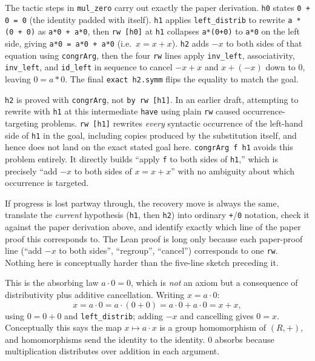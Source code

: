 The tactic steps in \texttt{mul\_\allowbreak{}zero} carry out exactly the paper derivation. \texttt{h0} states \texttt{0 + 0 = 0} (the identity padded with itself). \texttt{h1} applies \texttt{left\_\allowbreak{}distrib} to rewrite \texttt{a * (0 + 0)} as \texttt{a*0 + a*0}, then \texttt{rw [h0]} at \texttt{h1} collapses \texttt{a*(0+0)} to \texttt{a*0} on the left side, giving \texttt{a*0 = a*0 + a*0} (i.e.~\(x = x + x\)). \texttt{h2} adds \(-x\) to both sides of that equation using \texttt{congrArg}, then the four \texttt{rw} lines apply \texttt{inv\_\allowbreak{}left}, associativity, \texttt{inv\_\allowbreak{}left}, and \texttt{id\_\allowbreak{}left} in sequence to cancel \(-x + x\) and \(x + (-x)\) down to \(0\), leaving \(0 = a*0\). The final \texttt{exact h2.symm} flips the equality to match the goal.

\texttt{h2} is proved with \texttt{congrArg}, not \texttt{by rw [h1]}. In an earlier draft, attempting to rewrite with \texttt{h1} at this intermediate \texttt{have} using plain \texttt{rw} caused occurrence-targeting problems. \texttt{rw [h1]} rewrites \emph{every} syntactic occurrence of the left-hand side of \texttt{h1} in the goal, including copies produced by the substitution itself, and hence does not land on the exact stated goal here. \texttt{congrArg f h1} avoids this problem entirely. It directly builds ``apply \texttt{f} to both sides of \texttt{h1},'' which is precisely ``add \(-x\) to both sides of \(x = x+x\)'' with no ambiguity about which occurrence is targeted.

If progress is lost partway through, the recovery move is always the same, translate the \emph{current} hypothesis (\texttt{h1}, then \texttt{h2}) into ordinary \texttt{+}/\texttt{0} notation, check it against the paper derivation above, and identify exactly which line of the paper proof this corresponds to. The Lean proof is long only because each paper-proof line (``add \(-x\) to both sides'', ``regroup'', ``cancel'') corresponds to one \texttt{rw}. Nothing here is conceptually harder than the five-line sketch preceding it.

\begin{mathreading}

This is the absorbing law \(a\cdot 0 = 0\), which is \emph{not} an axiom but a consequence of distributivity plus additive cancellation. Writing \(x = a\cdot 0\): \[
x = a\cdot 0 = a\cdot(0+0) = a\cdot 0 + a\cdot 0 = x + x,
\] using \(0 = 0+0\) and \texttt{left\_\allowbreak{}distrib}; adding \(-x\) and cancelling gives \(0 = x\). Conceptually this says the map \(x \mapsto a\cdot x\) is a group homomorphism of \((R,+)\), and homomorphisms send the identity to the identity. \(0\) absorbs because multiplication distributes over addition in each argument.

\end{mathreading}

